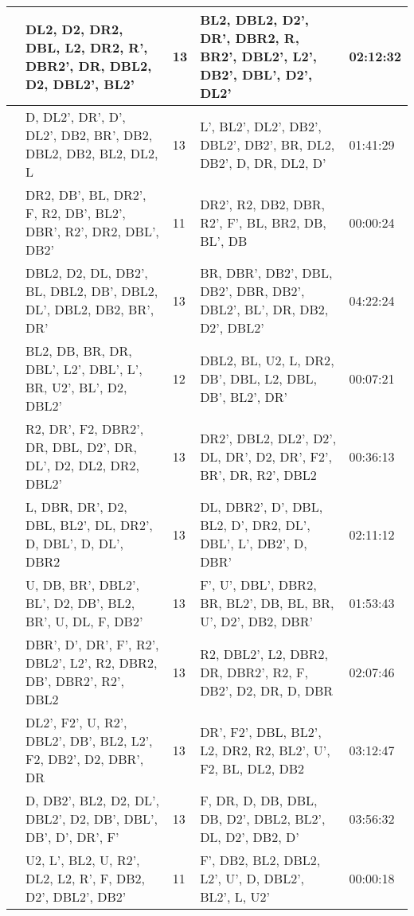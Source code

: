 \begin{table}[h]
{\begin{tabular}{|p{2cm}|p{7cm}|p{2cm}|p{7cm}|p{2.8cm}|}
 & DL2, D2, DR2, DBL, L2, DR2, R',   DBR2', DR, DBL2, D2, DBL2', BL2' & 13 & BL2, DBL2, D2', DR', DBR2, R,   BR2', DBL2', L2', DB2', DBL', D2', DL2' & 02:12:32 \\ \hline
 & D, DL2', DR', D', DL2', DB2,   BR', DB2, DBL2, DB2, BL2, DL2, L & 13 & L', BL2', DL2', DB2', DBL2',   DB2', BR, DL2, DB2', D, DR, DL2, D' & 01:41:29 \\ \hline
 & \cellcolor[HTML]{C5E0B3}DR2, DB', BL, DR2', F, R2, DB',   BL2', DBR', R2', DR2, DBL', DB2' & \cellcolor[HTML]{C5E0B3}11 & \cellcolor[HTML]{C5E0B3}DR2', R2, DB2, DBR, R2', F', BL,   BR2, DB, BL', DB & \cellcolor[HTML]{C5E0B3}00:00:24 \\ \hline
 & DBL2, D2, DL, DB2', BL, DBL2,   DB', DBL2, DL', DBL2, DB2, BR', DR' & 13 & BR, DBR', DB2', DBL, DB2', DBR,   DB2', DBL2', BL', DR, DB2, D2', DBL2' & 04:22:24 \\ \hline
 & \cellcolor[HTML]{E2EFD9}BL2, DB, BR, DR, DBL', L2',   DBL', L', BR, U2', BL', D2, DBL2' & \cellcolor[HTML]{E2EFD9}12 & \cellcolor[HTML]{E2EFD9}DBL2, BL, U2, L, DR2, DB', DBL,   L2, DBL, DB', BL2', DR' & \cellcolor[HTML]{E2EFD9}00:07:21 \\ \hline
 & R2, DR', F2, DBR2', DR, DBL,   D2', DR, DL', D2, DL2, DR2, DBL2' & 13 & DR2', DBL2, DL2', D2', DL, DR',   D2, DR', F2', BR', DR, R2', DBL2 & 00:36:13 \\ \hline
 & L, DBR, DR', D2, DBL, BL2', DL,   DR2', D, DBL', D, DL', DBR2 & 13 & DL, DBR2', D', DBL, BL2, D',   DR2, DL', DBL', L', DB2', D, DBR' & 02:11:12 \\ \hline
 & U, DB, BR', DBL2', BL', D2, DB',   BL2, BR', U, DL, F, DB2' & 13 & F', U', DBL', DBR2, BR, BL2',   DB, BL, BR, U', D2', DB2, DBR' & 01:53:43 \\ \hline
 & DBR', D', DR', F', R2', DBL2',   L2', R2, DBR2, DB', DBR2', R2', DBL2 & 13 & R2, DBL2', L2, DBR2, DR, DBR2',   R2, F, DB2', D2, DR, D, DBR & 02:07:46 \\ \hline
 & DL2', F2', U, R2', DBL2', DB',   BL2, L2', F2, DB2', D2, DBR', DR & 13 & DR', F2', DBL, BL2', L2, DR2,   R2, BL2', U', F2, BL, DL2, DB2 & 03:12:47 \\ \hline
 & D, DB2', BL2, D2, DL', DBL2',   D2, DB', DBL', DB', D', DR', F' & 13 & F, DR, D, DB, DBL, DB, D2',   DBL2, BL2', DL, D2', DB2, D' & 03:56:32 \\ \hline
 & \cellcolor[HTML]{C5E0B3}U2, L', BL2, U, R2', DL2, L2,   R', F, DB2, D2', DBL2', DB2' & \cellcolor[HTML]{C5E0B3}11 & \cellcolor[HTML]{C5E0B3}F', DB2, BL2, DBL2, L2', U', D,   DBL2', BL2', L, U2' & \cellcolor[HTML]{C5E0B3}00:00:18 \\ \hline

\end{tabular}}
\end{table}
